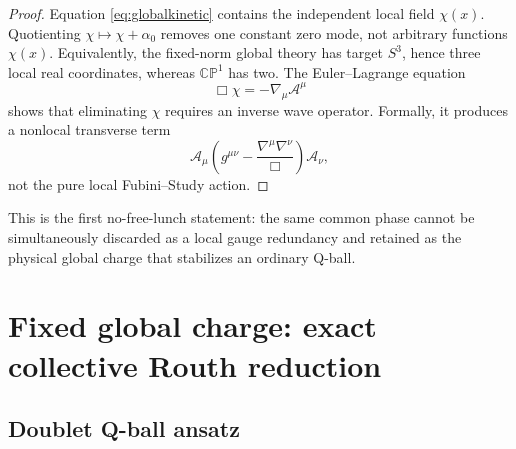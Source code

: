\documentclass[11pt]{article}
\numberwithin{equation}{section}
\newcommand{\CP}{\mathbb{CP}}
\begin{document}
\begin{proof}
Equation \eqref{eq:globalkinetic} contains the independent local field
\(\chi(x)\).  Quotienting \(\chi\mapsto\chi+\alpha_0\) removes one constant
zero mode, not arbitrary functions \(\chi(x)\).  Equivalently, the fixed-norm
global theory has target \(S^3\), hence three local real coordinates, whereas
\(\CP^1\) has two.  The Euler--Lagrange equation
\begin{equation}
 \Box\chi=-\nabla_\mu\mathcal A^\mu
 \label{eq:chieom}
\end{equation}
shows that eliminating \(\chi\) requires an inverse wave operator.  Formally,
it produces a nonlocal transverse term
\begin{equation}
 \mathcal A_\mu\left(g^{\mu\nu}
 -\frac{\nabla^\mu\nabla^\nu}{\Box}\right)\mathcal A_\nu,
 \label{eq:nonlocalterm}
\end{equation}
not the pure local Fubini--Study action.
\end{proof}

This is the first no-free-lunch statement: the same common phase cannot be
simultaneously discarded as a local gauge redundancy and retained as the
physical global charge that stabilizes an ordinary Q-ball.

\section{Fixed global charge: exact collective Routh reduction}

\subsection{Doublet Q-ball ansatz}
\end{document}
